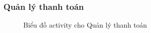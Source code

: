 \subsubsection{Quản lý thanh toán}
\begin{figure}[H]
    \centering
     
    \vspace{0.5cm}
    \caption{Biểu đồ activity cho Quản lý thanh toán}
    \label{fig:enter-label}
\end{figure}
